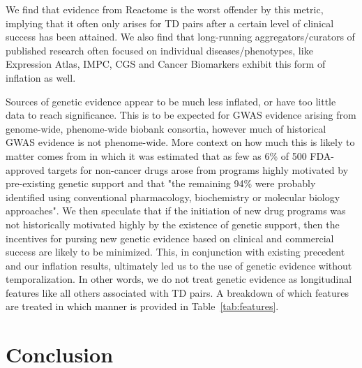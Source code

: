 \documentclass{article}
\begin{document}
We find that evidence from Reactome is the worst offender by this metric, implying that it often only arises for TD pairs after a certain level of clinical success has been attained. We also find that long-running aggregators/curators of published research often focused on individual diseases/phenotypes, like Expression Atlas, IMPC, CGS and Cancer Biomarkers exhibit this form of inflation as well.

Sources of genetic evidence appear to be much less inflated, or have too little data to reach significance. This is to be expected for GWAS evidence arising from genome-wide, phenome-wide biobank consortia, however much of historical GWAS evidence is not phenome-wide. More context on how much this is likely to matter comes from \cite{PMID:37612393} in which it was estimated that as few as 6\% of 500 FDA-approved targets for non-cancer drugs arose from programs highly motivated by pre-existing genetic support and that "the remaining 94\% were probably identified using conventional pharmacology, biochemistry or molecular biology approaches". We then speculate that if the initiation of new drug programs was not historically motivated highly by the existence of genetic support, then the incentives for pursing new genetic evidence based on clinical and commercial success are likely to be minimized. This, in conjunction with existing precedent \cite{Nelson2015-eg,King2019-rc,Minikel2023.06.23.23291765,Razuvayevskaya2023.02.07.23285407,PMID:30652614,PMID:35804044} and our inflation results, ultimately led us to the use of genetic evidence without temporalization. In other words, we do not treat genetic evidence as longitudinal features like all others associated with TD pairs. A breakdown of which features are treated in which manner is provided in Table~\ref{tab:features}.

\section{Conclusion}
\end{document}

